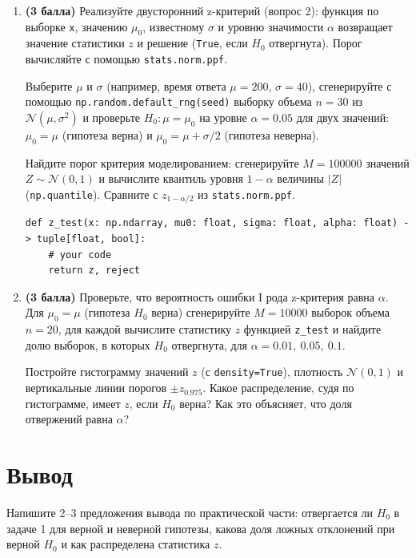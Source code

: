 \documentclass[a4paper,12pt]{article}
\newcommand{\pts}[1]{\textbf{(#1)}}
\begin{document}
\begin{enumerate}
  \item \pts{3 балла} Реализуйте двусторонний z-критерий (вопрос 2): функция по выборке \lstinline|x|, значению $\mu_0$, известному $\sigma$ и уровню значимости $\alpha$ возвращает значение статистики $z$ и решение (\lstinline|True|, если $H_0$ отвергнута). Порог вычисляйте с помощью \lstinline|stats.norm.ppf|.

  Выберите $\mu$ и $\sigma$ (например, время ответа $\mu=200$, $\sigma=40$), сгенерируйте с помощью \lstinline|np.random.default_rng(seed)| выборку объема $n=30$ из $\mathcal{N}(\mu,\sigma^2)$ и проверьте $H_0\colon\mu=\mu_0$ на уровне $\alpha=0.05$ для двух значений: $\mu_0=\mu$ (гипотеза верна) и $\mu_0=\mu+\sigma/2$ (гипотеза неверна).

  Найдите порог критерия моделированием: сгенерируйте $M=100000$ значений $Z\sim\mathcal{N}(0,1)$ и вычислите квантиль уровня $1-\alpha$ величины $|Z|$ (\lstinline|np.quantile|). Сравните с $z_{1-\alpha/2}$ из \lstinline|stats.norm.ppf|.
\begin{lstlisting}
def z_test(x: np.ndarray, mu0: float, sigma: float, alpha: float) -> tuple[float, bool]:
    # your code
    return z, reject
\end{lstlisting}

  \item \pts{3 балла} Проверьте, что вероятность ошибки I рода z-критерия равна $\alpha$. Для $\mu_0=\mu$ (гипотеза $H_0$ верна) сгенерируйте $M=10000$ выборок объема $n=20$, для каждой вычислите статистику $z$ функцией \lstinline|z_test| и найдите долю выборок, в которых $H_0$ отвергнута, для $\alpha=0.01,\ 0.05,\ 0.1$.

  Постройте гистограмму значений $z$ (с \lstinline|density=True|), плотность $\mathcal{N}(0,1)$ и вертикальные линии порогов $\pm z_{0.975}$. Какое распределение, судя по гистограмме, имеет $z$, если $H_0$ верна? Как это объясняет, что доля отвержений равна $\alpha$?

\end{enumerate}

\section*{Вывод}

Напишите 2--3 предложения вывода по практической части: отвергается ли $H_0$ в задаче 1 для верной и неверной гипотезы, какова доля ложных отклонений при верной $H_0$ и как распределена статистика $z$.
\end{document}
